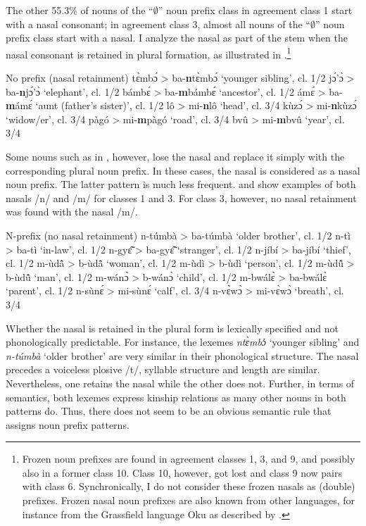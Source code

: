 The other 55.3\% of nouns of the ``$\emptyset$'' noun prefix class in agreement class 1 start with a nasal consonant; in agreement class 3, almost all nouns of the ``$\emptyset$'' noun prefix class start with a nasal. I analyze the nasal as part of the stem when the nasal consonant is retained in plural formation, as illustrated in .\footnote{Frozen noun prefixes are found in agreement classes 1, 3, and 9, and possibly also in a former class 10. Class 10, however, got lost and class 9 now pairs with class 6. Synchronically, I do not consider these frozen nasals as (double) prefixes. Frozen nasal noun prefixes are also known from other languages, for instance from the Grassfield language Oku as described by \citet[3]{blood99}.}


\ea\label{Noprefix} No prefix (nasal retainment)
tɛ̀mbɔ́ > ba-{\bfseries n}tɛ̀mbɔ́ `younger sibling', cl. 1/2
jɔ́'ɔ̀ > ba-{\bfseries n}jɔ́'ɔ̀ `elephant', cl. 1/2
bámbɛ́  >  ba-{\bfseries m}bámbɛ́  `ancestor', cl. 1/2
ámɛ́ > ba-{\bfseries m}ámɛ́ `aunt (father's sister)', cl. 1/2
lô >  mi-{\bfseries n}lô `head', cl. 3/4
kùzɔ́ >  mi-{\bfseries n}kùzɔ́ `widow/er', cl. 3/4
pàgó >  mi-{\bfseries m}pàgó `road', cl. 3/4
bvû >  mi-{\bfseries m}bvû `year', cl. 3/4
\z
\z

Some nouns such as in , however, lose the nasal and replace it simply with the corresponding plural noun prefix. In these cases, the nasal is considered as a nasal noun prefix. The latter pattern is much less frequent.  and  show examples of both nasals /n/ and /m/ for classes 1 and 3. For class 3, however, no nasal retainment was found with the nasal /m/.

\ea\label{Nprefix} N-prefix (no nasal retainment)
\ea n-túmbà > ba-túmbà `older brother', cl. 1/2
\ex n-tì >  ba-tì `in-law', cl. 1/2
\ex n-gyɛ̃̂ >  ba-gyɛ̃̂ `stranger', cl. 1/2
\ex n-jíbí >  ba-jíbí `thief', cl. 1/2
\ex m-ùdã̂ >  b-ùdã̂ `woman', cl. 1/2
\ex m-ùdì >  b-ùdì `person', cl. 1/2
\ex m-ùdũ̂ >  b-ùdũ̂ `man', cl. 1/2
\ex m-wánɔ̀ >  b-wánɔ̀ `child', cl. 1/2
\ex m-bwálɛ̀ >  ba-bwálɛ̀ `parent', cl. 1/2
\ex n-sùnɛ́ >  mi-sùnɛ́ `calf', cl. 3/4
\ex n-vɛ̀wɔ̀ >  mi-vɛ̀wɔ̀ `breath', cl. 3/4
\z
\z

Whether the nasal is retained in the plural form is lexically specified and not phonologically predictable.  For instance, the lexemes {\itshape ntɛ̀mbɔ}́ `younger sibling' and {\itshape n-túmbà} `older brother' are very similar in their phonological structure. The nasal precedes a voiceless plosive /t/, syllable structure and length are similar. Nevertheless, one retains the nasal while the other does not.  Further, in terms of semantics, both lexemes express kinship relations as many other nouns in both patterns do. Thus, there does not seem to be an obvious semantic rule that assigns noun prefix patterns.

